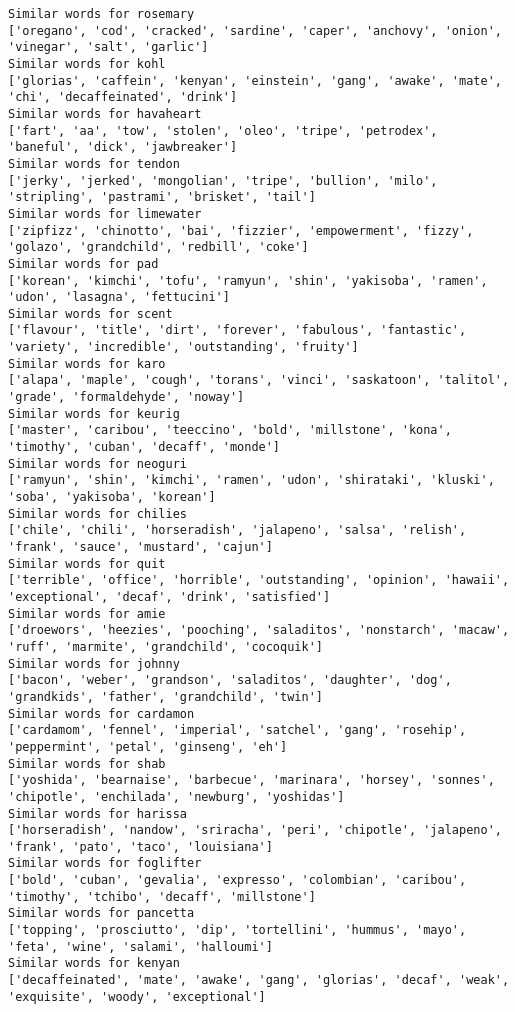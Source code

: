 \documentclass[11pt]{article}
\begin{document}
\begin{Verbatim}[commandchars=\\\{\}]
Similar words for rosemary
['oregano', 'cod', 'cracked', 'sardine', 'caper', 'anchovy', 'onion', 'vinegar', 'salt', 'garlic']
Similar words for kohl
['glorias', 'caffein', 'kenyan', 'einstein', 'gang', 'awake', 'mate', 'chi', 'decaffeinated', 'drink']
Similar words for havaheart
['fart', 'aa', 'tow', 'stolen', 'oleo', 'tripe', 'petrodex', 'baneful', 'dick', 'jawbreaker']
Similar words for tendon
['jerky', 'jerked', 'mongolian', 'tripe', 'bullion', 'milo', 'stripling', 'pastrami', 'brisket', 'tail']
Similar words for limewater
['zipfizz', 'chinotto', 'bai', 'fizzier', 'empowerment', 'fizzy', 'golazo', 'grandchild', 'redbill', 'coke']
Similar words for pad
['korean', 'kimchi', 'tofu', 'ramyun', 'shin', 'yakisoba', 'ramen', 'udon', 'lasagna', 'fettucini']
Similar words for scent
['flavour', 'title', 'dirt', 'forever', 'fabulous', 'fantastic', 'variety', 'incredible', 'outstanding', 'fruity']
Similar words for karo
['alapa', 'maple', 'cough', 'torans', 'vinci', 'saskatoon', 'talitol', 'grade', 'formaldehyde', 'noway']
Similar words for keurig
['master', 'caribou', 'teeccino', 'bold', 'millstone', 'kona', 'timothy', 'cuban', 'decaff', 'monde']
Similar words for neoguri
['ramyun', 'shin', 'kimchi', 'ramen', 'udon', 'shirataki', 'kluski', 'soba', 'yakisoba', 'korean']
Similar words for chilies
['chile', 'chili', 'horseradish', 'jalapeno', 'salsa', 'relish', 'frank', 'sauce', 'mustard', 'cajun']
Similar words for quit
['terrible', 'office', 'horrible', 'outstanding', 'opinion', 'hawaii', 'exceptional', 'decaf', 'drink', 'satisfied']
Similar words for amie
['droewors', 'heezies', 'pooching', 'saladitos', 'nonstarch', 'macaw', 'ruff', 'marmite', 'grandchild', 'cocoquik']
Similar words for johnny
['bacon', 'weber', 'grandson', 'saladitos', 'daughter', 'dog', 'grandkids', 'father', 'grandchild', 'twin']
Similar words for cardamon
['cardamom', 'fennel', 'imperial', 'satchel', 'gang', 'rosehip', 'peppermint', 'petal', 'ginseng', 'eh']
Similar words for shab
['yoshida', 'bearnaise', 'barbecue', 'marinara', 'horsey', 'sonnes', 'chipotle', 'enchilada', 'newburg', 'yoshidas']
Similar words for harissa
['horseradish', 'nandow', 'sriracha', 'peri', 'chipotle', 'jalapeno', 'frank', 'pato', 'taco', 'louisiana']
Similar words for foglifter
['bold', 'cuban', 'gevalia', 'expresso', 'colombian', 'caribou', 'timothy', 'tchibo', 'decaff', 'millstone']
Similar words for pancetta
['topping', 'prosciutto', 'dip', 'tortellini', 'hummus', 'mayo', 'feta', 'wine', 'salami', 'halloumi']
Similar words for kenyan
['decaffeinated', 'mate', 'awake', 'gang', 'glorias', 'decaf', 'weak', 'exquisite', 'woody', 'exceptional']

\end{Verbatim}
\end{document}
